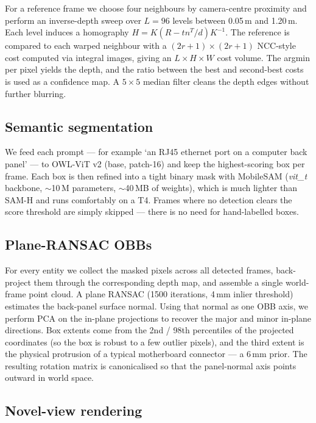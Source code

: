 \documentclass[11pt,a4paper]{article}
\begin{document}
For a reference frame we choose four neighbours by camera-centre proximity and perform an inverse-depth sweep over $L = 96$ levels between 0.05\,m and 1.20\,m. Each level induces a homography $H = K (R - t n^T / d) K^{-1}$. The reference is compared to each warped neighbour with a $(2r+1) \times (2r+1)$ NCC-style cost computed via integral images, giving an $L \times H \times W$ cost volume. The argmin per pixel yields the depth, and the ratio between the best and second-best costs is used as a confidence map. A $5 \times 5$ median filter cleans the depth edges without further blurring.

\subsection{Semantic segmentation}

We feed each prompt --- for example `an RJ45 ethernet port on a computer back panel' --- to OWL-ViT v2 (base, patch-16) and keep the highest-scoring box per frame. Each box is then refined into a tight binary mask with MobileSAM (\textit{vit\_t} backbone, $\sim$10\,M parameters, $\sim$40\,MB of weights), which is much lighter than SAM-H and runs comfortably on a T4. Frames where no detection clears the score threshold are simply skipped --- there is no need for hand-labelled boxes.

\subsection{Plane-RANSAC OBBs}

For every entity we collect the masked pixels across all detected frames, back-project them through the corresponding depth map, and assemble a single world-frame point cloud. A plane RANSAC (1500 iterations, 4\,mm inlier threshold) estimates the back-panel surface normal. Using that normal as one OBB axis, we perform PCA on the in-plane projections to recover the major and minor in-plane directions. Box extents come from the 2nd / 98th percentiles of the projected coordinates (so the box is robust to a few outlier pixels), and the third extent is the physical protrusion of a typical motherboard connector --- a 6\,mm prior. The resulting rotation matrix is canonicalised so that the panel-normal axis points outward in world space.

\subsection{Novel-view rendering}
\end{document}
